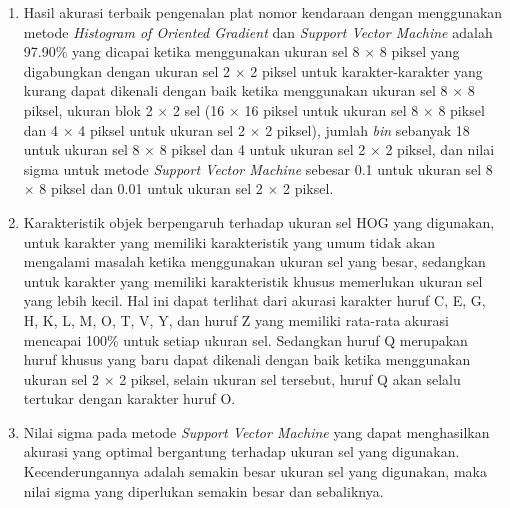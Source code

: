 \begin{enumerate}
\item Hasil akurasi terbaik pengenalan plat nomor kendaraan dengan menggunakan metode \textit{Histogram of Oriented Gradient} dan \textit{Support Vector Machine} adalah 97.90\% yang dicapai ketika menggunakan ukuran sel 8 $\times$ 8 piksel yang digabungkan dengan ukuran sel 2 $\times$ 2 piksel untuk karakter-karakter yang kurang dapat dikenali dengan baik ketika menggunakan ukuran sel 8 $\times$ 8 piksel, ukuran blok 2 $\times$ 2 sel (16 $\times$ 16 piksel untuk ukuran sel 8 $\times$ 8 piksel dan 4 $\times$ 4 piksel untuk ukuran sel 2 $\times$ 2 piksel), jumlah \textit{bin} sebanyak 18 untuk ukuran sel 8 $\times$ 8 piksel dan 4 untuk ukuran sel 2 $\times$ 2 piksel, dan nilai sigma untuk metode \textit{Support Vector Machine} sebesar 0.1 untuk ukuran sel 8 $\times$ 8 piksel dan 0.01 untuk ukuran sel 2 $\times$ 2 piksel.

\item Karakteristik objek berpengaruh terhadap ukuran sel HOG yang digunakan, untuk karakter yang memiliki karakteristik yang umum tidak akan mengalami masalah ketika menggunakan ukuran sel yang besar, sedangkan untuk karakter yang memiliki karakteristik khusus memerlukan ukuran sel yang lebih kecil. Hal ini dapat terlihat dari akurasi karakter huruf C, E, G, H, K, L, M, O, T, V, Y, dan huruf Z yang memiliki rata-rata akurasi mencapai 100\% untuk setiap ukuran sel. Sedangkan huruf Q merupakan huruf khusus yang baru dapat dikenali dengan baik ketika menggunakan ukuran sel 2 $\times$ 2 piksel, selain ukuran sel tersebut, huruf Q akan selalu tertukar dengan karakter huruf O. 

\item Nilai sigma pada metode \textit{Support Vector Machine} yang dapat menghasilkan akurasi yang optimal bergantung terhadap ukuran sel yang digunakan. Kecenderungannya adalah semakin besar ukuran sel yang digunakan, maka nilai sigma yang diperlukan semakin besar dan sebaliknya.\\


\end{enumerate}

